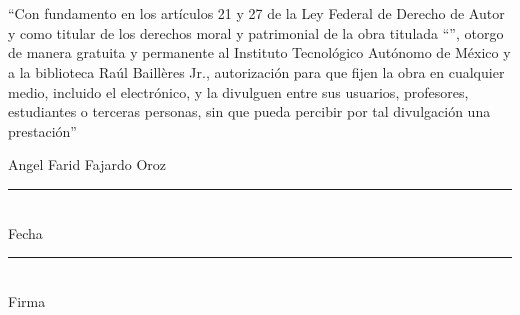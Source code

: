 \thispagestyle{empty}
\chapter*{\phantom{Declaración}}
``Con fundamento en los artículos 21 y 27 de la Ley Federal de Derecho de Autor y como titular de los derechos moral y patrimonial de la obra titulada ``\textbf{\thetitle}'', otorgo de manera gratuita y permanente al Instituto Tecnológico Autónomo de México y a la biblioteca Raúl Baillères Jr., autorización para que fijen la obra en cualquier medio, incluido el electrónico, y la divulguen entre sus usuarios, profesores, estudiantes o terceras personas, sin que pueda percibir por tal divulgación una prestación''
    \\
    \begin{center}
        Angel Farid Fajardo Oroz\\
        \vspace{4em}
        \rule[0mm]{60mm}{0.1mm}\\
        Fecha\\
        \vspace{3em}
        \rule[0mm]{60mm}{0.1mm}\\
        Firma\\
    \end{center}
\clearpage
